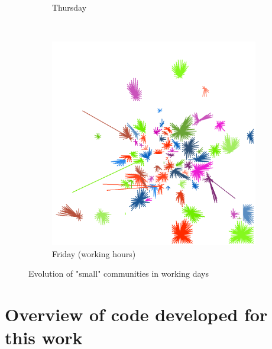 \documentclass[12pt,a4paper]{article}
\begin{document}
\begin{figure}[H]
\begin{subfigure}[b]{0.48\textwidth}
\caption{Thursday}
\end{subfigure}
\\
\begin{subfigure}[b]{0.48\textwidth}
\includegraphics[width=\textwidth]{weekDef/edges-5Fri-small.png}
\caption{Friday (working hours)}
\end{subfigure}

\caption{Evolution of "small" communities in working days}
\end{figure}
\newpage

\section{Overview of code developed for this work}

\end{document}
